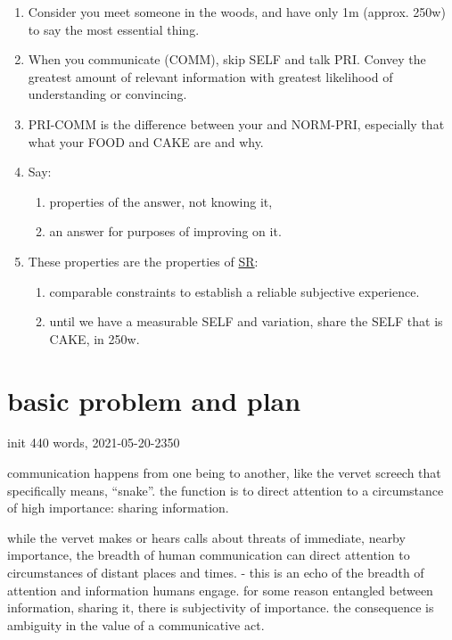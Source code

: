 \documentclass[
]{book}
\providecommand{\tightlist}{%
  \setlength{\itemsep}{0pt}\setlength{\parskip}{0pt}}
\begin{document}
\begin{enumerate}
\def\labelenumi{\arabic{enumi}.}
\item
  Consider you meet someone in the woods, and have only 1m (approx. 250w) to say the most essential thing.
\item
  When you communicate (COMM), skip SELF and talk PRI. Convey the greatest amount of relevant information with greatest likelihood of understanding or convincing.
\item
  PRI-COMM is the difference between your and NORM-PRI, especially that what your FOOD and CAKE are and why.
\item
  Say:

  \begin{enumerate}
  \def\labelenumii{\arabic{enumii}.}
  \tightlist
  \item
    properties of the answer, not knowing it,
  \item
    an answer for purposes of improving on it.
  \end{enumerate}
\item
  These properties are the properties of \protect\hyperlink{skilled-reflection}{SR}:

  \begin{enumerate}
  \def\labelenumii{\arabic{enumii}.}
  \tightlist
  \item
    comparable constraints to establish a reliable subjective experience.
  \item
    until we have a measurable SELF and variation, share the SELF that is CAKE, in 250w.
  \end{enumerate}
\end{enumerate}

\hypertarget{basic-problem-and-plan}{%
\section{basic problem and plan}\label{basic-problem-and-plan}}

init 440 words, 2021-05-20-2350

communication happens from one being to another,
like the vervet screech that specifically means, ``snake''.
the function is to direct attention to a circumstance of high importance:
sharing information.

while the vervet makes or hears calls about threats of immediate, nearby importance,
the breadth of human communication can direct attention to circumstances of
distant places and times.
- this is an echo of the breadth of attention and information humans engage.
for some reason entangled between information, sharing it, there is subjectivity of importance.
the consequence is ambiguity in the value of a communicative act.
\end{document}
